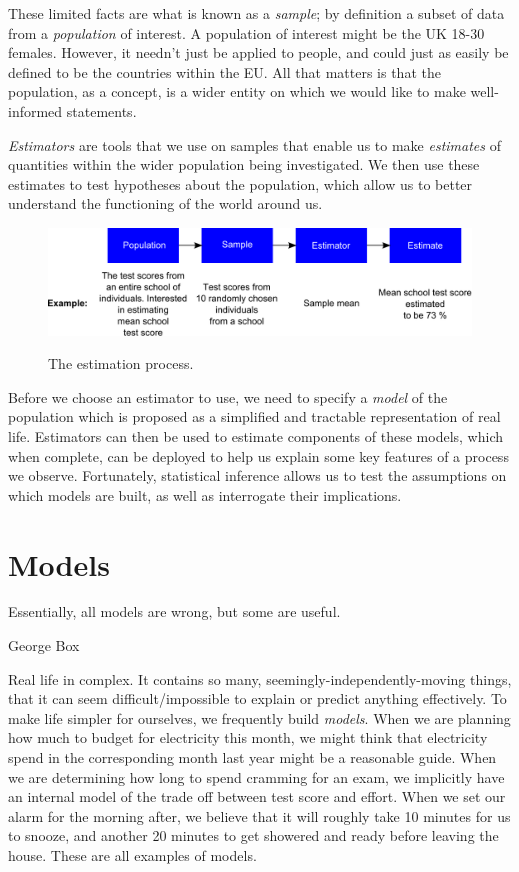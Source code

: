 \documentclass[11pt,fullpage]{book}
\begin{document}
These limited facts are what is known as a \textit{sample}; by definition a subset of data from a \textit{population} of interest. A population of interest might be the UK 18-30 females. However, it needn't just be applied to people, and could just as easily be defined to be the countries within the EU. All that matters is that the population, as a concept, is a wider entity on which we would like to make well-informed statements. 

\textit{Estimators} are tools that we use on samples that enable us to make \textit{estimates} of quantities within the wider population being investigated. We then use these estimates to test hypotheses about the population, which allow us to better understand the functioning of the world around us.

\begin{figure}
\centering
\scalebox{0.6} 
{\includegraphics{Estimators_estimatorEstimate.pdf}}
\caption{The estimation process.}\label{fig:Estimators_estimatorEstimate}
\end{figure}

Before we choose an estimator to use, we need to specify a \textit{model} of the population which is proposed as a simplified and tractable representation of real life. Estimators can then be used to estimate components of these models, which when complete, can be deployed to help us explain some key features of a process we observe. Fortunately, statistical inference allows us to test the assumptions on which models are built, as well as interrogate their implications. 

\section{Models}
\epigraph{Essentially, all models are wrong, but some are useful.}{George Box}

Real life in complex. It contains so many, seemingly-independently-moving things, that it can seem difficult/impossible to explain or predict anything effectively. To make life simpler for ourselves, we frequently build \textit{models}. When we are planning how much to budget for electricity this month, we might think that electricity spend in the corresponding month last year might be a reasonable guide. When we are determining how long to spend cramming for an exam, we implicitly have an internal model of the trade off between test score and effort. When we set our alarm for the morning after, we believe that it will roughly take 10 minutes for us to snooze, and another 20 minutes to get showered and ready before leaving the house. These are all examples of models. 
\end{document}
